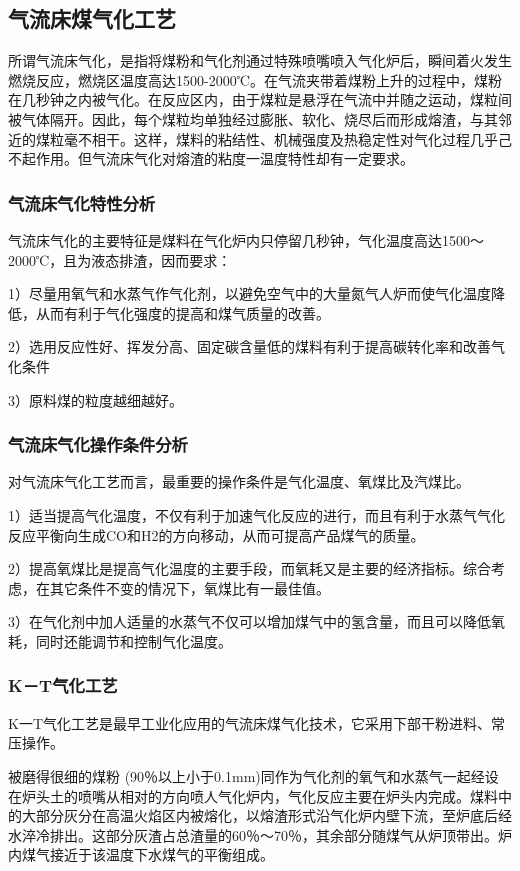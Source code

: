 \documentclass[10pt,openany]{ctexbook}
\begin{document}
\subsection{气流床煤气化工艺}
所谓气流床气化，是指将煤粉和气化剂通过特殊喷嘴喷入气化炉后，瞬间着火发生燃烧反应，燃烧区温度高达1500-2000℃。在气流夹带着煤粉上升的过程中，煤粉在几秒钟之内被气化。在反应区内，由于煤粒是悬浮在气流中并随之运动，煤粒间被气体隔开。因此，每个煤粒均单独经过膨胀、软化、烧尽后而形成熔渣，与其邻近的煤粒毫不相干。这样，煤料的粘结性、机械强度及热稳定性对气化过程几乎己不起作用。但气流床气化对熔渣的粘度一温度特性却有一定要求。
\subsubsection{气流床气化特性分析}
气流床气化的主要特征是煤料在气化炉内只停留几秒钟，气化温度高达1500～2000℃，且为液态排渣，因而要求：\par
  1）尽量用氧气和水蒸气作气化剂，以避免空气中的大量氮气人炉而使气化温度降低，从而有利于气化强度的提高和煤气质量的改善。\par
  2）选用反应性好、挥发分高、固定碳含量低的煤料有利于提高碳转化率和改善气化条件\par
  3）原料煤的粒度越细越好。
\subsubsection{气流床气化操作条件分析}

对气流床气化工艺而言，最重要的操作条件是气化温度、氧煤比及汽煤比。\par
   1）适当提高气化温度，不仅有利于加速气化反应的进行，而且有利于水蒸气气化反应平衡向生成CO和H2的方向移动，从而可提高产品煤气的质量。\par
   2）提高氧煤比是提高气化温度的主要手段，而氧耗又是主要的经济指标。综合考虑，在其它条件不变的情况下，氧煤比有一最佳值。\par
   3）在气化剂中加人适量的水蒸气不仅可以增加煤气中的氢含量，而且可以降低氧耗，同时还能调节和控制气化温度。\par
\subsubsection{K－T气化工艺}
    K一T气化工艺是最早工业化应用的气流床煤气化技术，它采用下部干粉进料、常压操作。 \par
    被磨得很细的煤粉 (90％以上小于0.1mm)同作为气化剂的氧气和水蒸气一起经设在炉头土的喷嘴从相对的方向喷人气化炉内，气化反应主要在炉头内完成。煤料中的大部分灰分在高温火焰区内被熔化，以熔渣形式沿气化炉内壁下流，至炉底后经水淬冷排出。这部分灰渣占总渣量的60％～70％，其余部分随煤气从炉顶带出。炉内煤气接近于该温度下水煤气的平衡组成。
\end{document}
